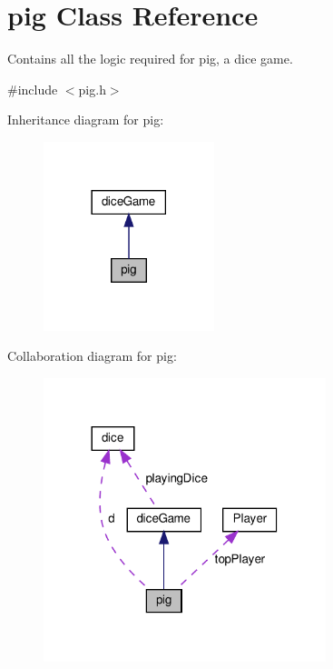 \hypertarget{classpig}{}\section{pig Class Reference}
\label{classpig}


Contains all the logic required for pig, a dice game.  




{\ttfamily \#include $<$pig.\+h$>$}



Inheritance diagram for pig\+:\nopagebreak
\begin{figure}[H]
\begin{center}
\leavevmode
\includegraphics[width=141pt]{classpig__inherit__graph}
\end{center}
\end{figure}


Collaboration diagram for pig\+:\nopagebreak
\begin{figure}[H]
\begin{center}
\leavevmode
\includegraphics[width=233pt]{classpig__coll__graph}
\end{center}
\end{figure}
